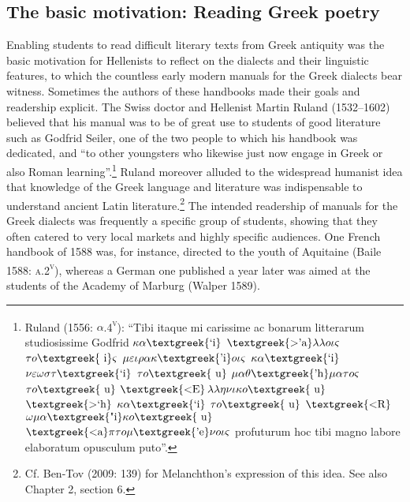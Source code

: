 \subsection{The basic motivation: Reading Greek poetry}
\hypertarget{Toc19704819}{}\begin{styleStandard}
Enabling students to read difficult literary texts from Greek antiquity was the basic motivation for Hellenists to reflect on the dialects and their linguistic features, to which the countless early modern manuals for the Greek dialects bear witness. Sometimes the authors of these handbooks made their goals and readership explicit. The Swiss doctor and Hellenist Martin Ruland (1532–1602) believed that his manual was to be of great use to students of good literature such as Godfrid Seiler, one of the two people to which his handbook was dedicated, and “to other youngsters who likewise just now engage in Greek or also Roman learning”.\footnote{ Ruland (1556: $\alpha $.4\textsc{\textsuperscript{v}}): “Tibi itaque mi carissime ac bonarum litterarum studiosissime Godfrid $\kappa \alpha \text{\textgreek{`i}}$ $\text{\textgreek{>'a}}\lambda \lambda o\iota \varsigma $ $\tau o\text{\textgreek{~i}}\varsigma $ $\mu \varepsilon \iota \rho \alpha \kappa \text{\textgreek{'i}}o\iota \varsigma $ $\kappa \alpha \text{\textgreek{`i}}$ $\nu \varepsilon \omega \sigma \tau \text{\textgreek{`i}}$ $\tau o\text{\textgreek{~u}}$ $\mu \alpha \theta \text{\textgreek{'h}}\mu \alpha \tau o\varsigma $ $\tau o\text{\textgreek{~u}}$ $\text{\textgreek{<E}}$$\lambda \lambda \eta \nu \iota \kappa o\text{\textgreek{~u}}$ $\text{\textgreek{>`h}}$ $\kappa \alpha \text{\textgreek{`i}}$ $\tau o\text{\textgreek{~u}}$ $\text{\textgreek{<R}}$$\omega \mu \alpha \text{\textgreek{"i}}\kappa o\text{\textgreek{~u}}$ $\text{\textgreek{<a}}\pi \tau o\mu \text{\textgreek{'e}}\nu o\iota \varsigma $ profuturum hoc tibi magno labore elaboratum opusculum puto”.} Ruland moreover alluded to the widespread humanist idea that knowledge of the Greek language and literature was indispensable to understand ancient Latin literature.\footnote{ Cf. Ben-Tov (2009: 139) for Melanchthon’s expression of this idea. See also Chapter 2, section 6.} The intended readership of manuals for the Greek dialects was frequently a specific group of students, showing that they often catered to very local markets and highly specific audiences. One French handbook of 1588 was, for instance, directed to the youth of Aquitaine (Baile 1588: \textsc{a.2}\textsc{\textsuperscript{v}}), whereas a German one published a year later was aimed at the students of the Academy of Marburg (Walper 1589).
\end{styleStandard}

